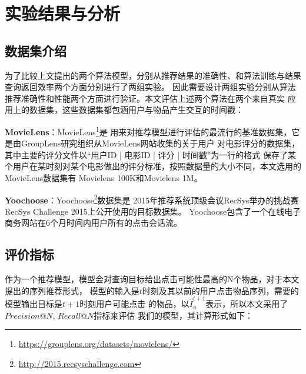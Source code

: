 ﻿%
\chapter{实验结果与分析}

\section{数据集介绍}

为了比较上文提出的两个算法模型，分别从推荐结果的准确性、和算法训练与结果查询返回效率两个方面分别进行了两组实验。%
因此需要设计两组实验分别从算法推荐准确性和性能两个方面进行验证。本文评估上述两个算法在两个来自真实%
应用上的数据集，这些数据集都包涵用户与物品产生交互的时间戳：

\textbf{MovieLens}：MovieLens\footnote{\url{https://grouplens.org/datasets/movielens/}}是%
用来对推荐模型进行评估的最流行的基准数据集，它是由GroupLens研究组织从MovieLens网站收集的关于用户%
对电影评分的数据集，其中主要的评分文件以“用户ID | 电影ID | 评分 | 时间戳”为一行的格式%
保存了某个用户在某时刻对某个电影做出的评分标准，按照数据量的大小不同，本文选用的MovieLens数据集有%
Movielens 100K和Movielens 1M。

\textbf{Yoochoose}：Yoochoose\footnote{\url{http://2015.recsyschallenge.com}}数据集是%
2015年推荐系统顶级会议RecSys举办的挑战赛RecSys Challenge 2015上公开使用的目标数据集。%
Yoochoose包含了一个在线电子商务网站在6个月时间内用户所有的点击会话流。%




\section{评价指标}
作为一个推荐模型，模型会对查询目标给出点击可能性最高的N个物品，对于本文提出的序列推荐形式，%
模型的输入是$t$时刻及其以前的用户点击物品序列，需要的模型输出目标是$t+1$时刻用户可能点击%
的物品，以$\hat{I}_{u}^{t+1}$表示，所以本文采用了$Precision@N$, $Recall@N$指标来评估%
我们的模型，其计算形式如下：

